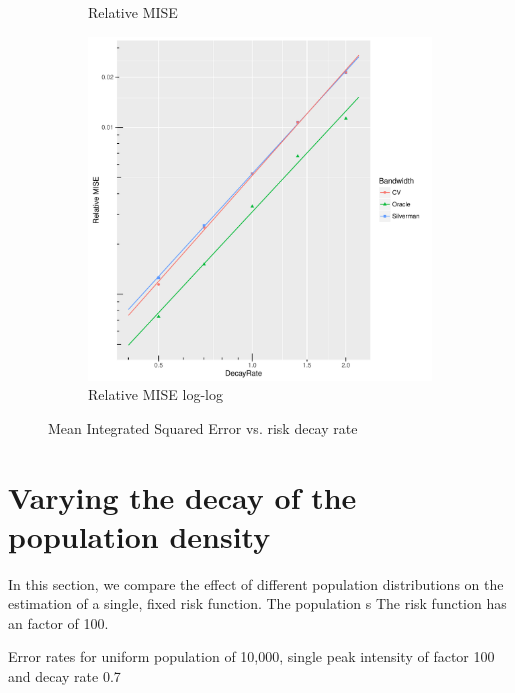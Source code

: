 \begin{figure}[htbp]
\begin{subfigure}[b]{0.3\textwidth}
    \caption{Relative MISE}
    \end{subfigure}
    \begin{subfigure}[b]{0.3\textwidth}
    \includegraphics[width=\textwidth]{results/by_cases_decay/RMISE-vs-risk-decay-log-log}
    \caption{Relative MISE log-log}
    \end{subfigure}
    \caption[MISE: by risk decay]{Mean Integrated Squared Error vs. risk decay rate}
    \label{fig:ise:unif_100_SD}
\end{figure}

\section{Varying the decay of the population density}
\label{sec:results:pSD_100_1h}

In this section, we compare the effect of different population distributions on the estimation of a single, fixed risk function.
The population s
The risk function has an \gls{factor} of 100.

\begin{table}[htbp]
\centering

\caption{Error rates for uniform population of 10,000, single peak intensity of \gls{factor} 100 and decay rate 0.7}
\label{tab:results:p0.7_100_1.0_1h}
\end{table}


